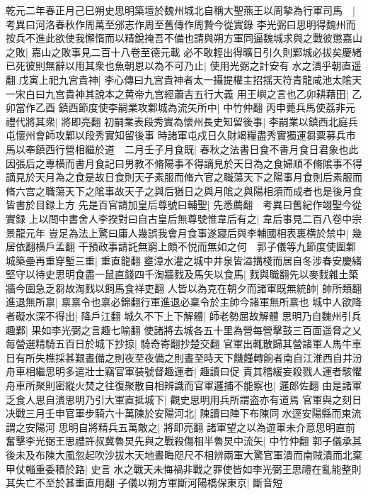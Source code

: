 乾元二年春正月己巳朔史思明築壇於魏州城北自稱大聖燕王以周摯為行軍司馬　|{
	考異曰河洛春秋作周萬至邠志作周至舊傳作周贄今從實錄}
李光弼曰思明得魏州而按兵不進此欲使我懈惰而以精銳掩吾不備也請與朔方軍同逼魏城求與之戰彼懲嘉山之敗|{
	嘉山之敗事見二百十八卷至德元載}
必不敢輕出得曠日引久則鄴城必拔矣慶緒已死彼則無辭以用其衆也魚朝恩以為不可乃止|{
	使用光弼之計安有水之潰乎朝直遥翻}
戊寅上祀九宫貴神|{
	李心傳曰九宫貴神者太一攝提權主招揺天符青龍咸池太隂天一宋白曰九宫貴神其說本之黄帝九宫經蕭吉五行大義}
用王嶼之言也乙卯耕藉田|{
	乙卯當作乙酉}
鎮西節度使李嗣業攻鄴城為流矢所中|{
	中竹仲翻}
丙申薨兵馬使荔非元禮代將其衆|{
	將即亮翻}
初嗣業表段秀實為懷州長史知留後事|{
	李嗣業以鎮西北庭兵屯懷州會師攻鄴以段秀實知留後事}
時諸軍屯戍日久財竭糧盡秀實獨運芻粟募兵市馬以奉鎮西行營相繼於道　二月壬子月食既|{
	春秋之法書日食不書月食日君象也此因張后之專横而書月食記曰男教不脩陽事不得謫見於天日為之食婦順不脩隂事不得謫見於天月為之食是故日食則天子素服而脩六官之職蕩天下之陽事月食則后素服而脩六宫之職蕩天下之隂事故天子之與后猶日之與月隂之與陽相須而成者也是後月食皆書於目録上方}
先是百官請加皇后尊號曰輔聖|{
	先悉薦翻　考異曰舊紀作翊聖今從實録}
上以問中書舍人李揆對曰自古皇后無尊號惟韋后有之|{
	韋后事見二百八卷中宗景龍元年}
豈足為法上驚曰庸人幾誤我會月食事遂寢后與李輔國相表裏横於禁中|{
	幾居依翻横戶孟翻}
干預政事請託無窮上頗不悦而無如之何　郭子儀等九節度使圍鄴城築壘再重穿塹三重|{
	重直龍翻}
壅漳水灌之城中井泉皆溢搆棧而居自冬涉春安慶緒堅守以待史思明食盡一鼠直錢四千淘牆䴰及馬矢以食馬|{
	䴰與職翻先以麥䴰雜土築牆今圍急乏芻故淘䴰以飼馬食祥吏翻}
人皆以為克在朝夕而諸軍既無統帥|{
	帥所類翻}
進退無所禀|{
	禀禀令也禀必錦翻行軍進退必稟令於主帥今諸軍無所禀也}
城中人欲降者礙水深不得出|{
	降戶江翻}
城久不下上下解體|{
	師老勢屈故解體}
思明乃自魏州引兵趣鄴|{
	果如李光弼之言趣七喻翻}
使諸將去城各五十里為營每營擊鼓三百面遥脅之乂每營選精騎五百日於城下抄掠|{
	騎奇寄翻抄楚交翻}
官軍出輒散歸其營諸軍人馬牛車日有所失樵採甚艱晝備之則夜至夜備之則晝至時天下饑饉轉餉者南自江淮西自并汾舟車相繼思明多遣壯士竊官軍装號督趣運者|{
	趣讀曰促}
責其稽緩妄殺戮人運者駭懼舟車所聚則密縱火焚之往復聚散自相辨識而官軍邏捕不能察也|{
	邏郎佐翻}
由是諸軍乏食人思自潰思明乃引大軍直抵城下|{
	觀史思明用兵所謂盗亦有道焉}
官軍與之刻日决戰三月壬申官軍步騎六十萬陳於安陽河北|{
	陳讀曰陣下布陳同水逕安陽縣而東流謂之安陽河}
思明自將精兵五萬敵之|{
	將即亮翻}
諸軍望之以為遊軍未介意思明直前奮擊李光弼王思禮許叔冀魯炅先與之戰殺傷相半魯炅中流矢|{
	中竹仲翻}
郭子儀承其後未及布陳大風忽起吹沙拔木天地晝晦咫尺不相辨兩軍大驚官軍潰而南賊潰而北棄甲仗輜重委積於路|{
	史言水之戰天未悔禍非戰之罪使皆如李光弼王思禮在亂能整則其失亡不至於甚重直用翻}
子儀以朔方軍斷河陽橋保東京|{
	斷音短}
